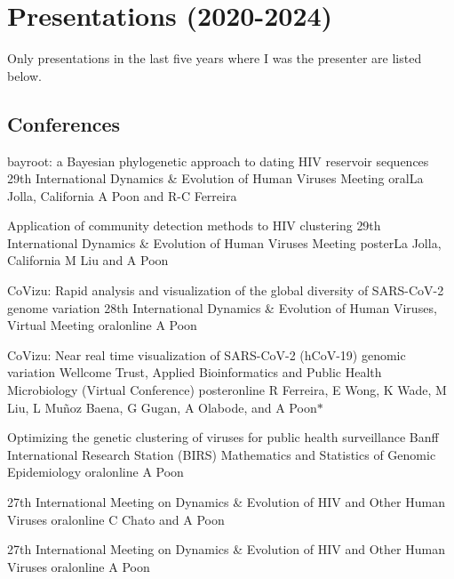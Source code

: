 
\section {Presentations (2020-2024)}

Only presentations in the last five years where I was the presenter are listed below.

\subsection {Conferences}


{bayroot: a Bayesian phylogenetic approach to dating HIV reservoir sequences}
{29th International Dynamics \& Evolution of Human Viruses Meeting}
{oral}{La Jolla, California}
{A Poon and R-C Ferreira}{}


{Application of community detection methods to HIV clustering}
{29th International Dynamics \& Evolution of Human Viruses Meeting}
{poster}{La Jolla, California}
{M Liu and A Poon}{}



{CoVizu: Rapid analysis and visualization of the global diversity of SARS-CoV-2 genome variation}
{28th International Dynamics \& Evolution of Human Viruses, Virtual Meeting}
{oral}{online}
{A Poon}{}

{CoVizu: Near real time visualization of SARS-CoV-2 (hCoV-19) genomic variation}
{Wellcome Trust, Applied Bioinformatics and Public Health Microbiology (Virtual Conference)}
{poster}{online}
{R Ferreira, E Wong, K Wade, M Liu, L Mu\~noz Baena, G Gugan, A Olabode, and A Poon$\ast$}{}

{Optimizing the genetic clustering of viruses for public health surveillance}
{Banff International Research Station (BIRS) Mathematics and Statistics of Genomic Epidemiology}
{oral}{online}
{A Poon}{}

{27th International Meeting on Dynamics \& Evolution of HIV and Other Human Viruses}
{oral}{online}
{C Chato and A Poon}{}

{27th International Meeting on Dynamics \& Evolution of HIV and Other Human Viruses}
{oral}{online}
{A Poon}{}



